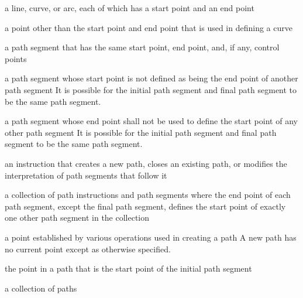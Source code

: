 
a line, curve, or arc, each of which has a start point and an end point

a point other than the start point and end point that is used in defining a curve

a path segment that has the same start point, end point, and, if any, control points

a path segment whose start point is not defined as being the end point of another path segment
\enternote
It is possible for the initial path segment and final path segment to be the same path segment.
\exitnote

a path segment whose end point shall not be used to define the start point of any other path segment
\enternote
It is possible for the initial path segment and final path segment to be the same path segment.
\exitnote

an instruction that creates a new path, closes an existing path, or modifies the interpretation of path segments that follow it

a collection of path instructions and path segments where the end point of each path segment, except the final path segment, defines the start point of exactly one other path segment in the collection

a point established by various operations used in creating a path
\enternote
A new path has no current point except as otherwise specified.
\exitnote

the point in a path that is the start point of the initial path segment

a collection of paths

